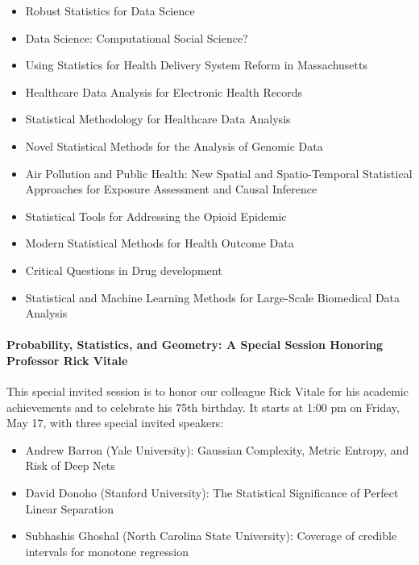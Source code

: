 \documentclass[12pt]{article}
\begin{document}
\begin{itemize}
\item
  Robust Statistics for Data Science

\item
  Data Science: Computational Social Science?

\item
  Using Statistics for Health Delivery System Reform in Massachusetts
\item
  Healthcare Data Analysis for Electronic Health Records
\item
  Statistical Methodology for Healthcare Data Analysis
\item
  Novel Statistical Methods for the Analysis of Genomic Data
\item
  Air Pollution and Public Health: New Spatial and Spatio-Temporal
  Statistical Approaches for Exposure Assessment and Causal Inference
\item
  Statistical Tools for Addressing the Opioid Epidemic
\item
  Modern Statistical Methods for Health Outcome Data
\item
  Critical Questions in Drug development
\item
  Statistical and Machine Learning Methods for Large-Scale Biomedical
  Data Analysis
\end{itemize}



\paragraph{Probability, Statistics, and Geometry: A Special Session
  Honoring Professor Rick Vitale}
This special invited session is to honor our colleague Rick Vitale for
his academic achievements and to celebrate his 75th birthday.
It starts at 1:00 pm on Friday, May 17, with three special
invited speakers:
\begin{itemize}
\item
\textsf{Andrew Barron} (Yale University): Gaussian Complexity, Metric
Entropy, and Risk of Deep Nets
\item
\textsf{David Donoho}  (Stanford University): The Statistical
Significance of Perfect Linear Separation
\item
\textsf{Subhashis Ghoshal} (North Carolina State University): Coverage
of credible intervals for monotone regression
\end{itemize}
\end{document}
